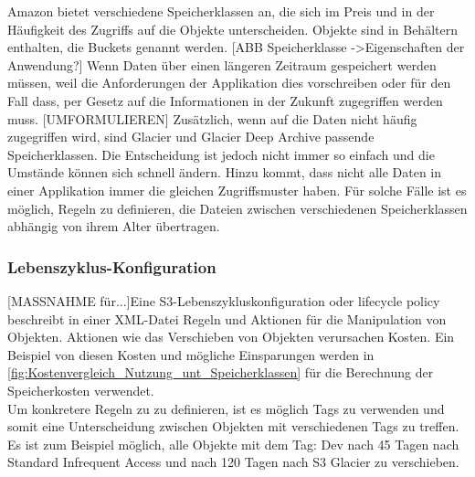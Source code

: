 Amazon bietet verschiedene Speicherklassen an, die sich im Preis und in der Häufigkeit des Zugriffs auf die Objekte unterscheiden. Objekte sind in Behältern enthalten, die Buckets genannt werden.
[ABB Speicherklasse ->Eigenschaften der Anwendung?]
Wenn Daten über einen längeren Zeitraum gespeichert werden müssen, weil die Anforderungen der Applikation dies vorschreiben oder für den Fall dass, per Gesetz auf die Informationen in der Zukunft zugegriffen werden muss.
[UMFORMULIEREN]
Zusätzlich, wenn auf die Daten nicht häufig zugegriffen wird, sind Glacier und Glacier Deep Archive passende Speicherklassen. Die Entscheidung ist jedoch nicht immer so einfach und die Umstände können sich schnell ändern. Hinzu kommt, dass nicht alle Daten in einer Applikation immer die gleichen Zugriffsmuster haben. Für solche Fälle ist es möglich, Regeln zu definieren, die Dateien zwischen verschiedenen Speicherklassen abhängig von ihrem Alter übertragen.

\subsubsection{Lebenszyklus-Konfiguration}
[MASSNAHME für...]Eine S3-Lebenszykluskonfiguration oder lifecycle policy beschreibt in einer XML-Datei Regeln und Aktionen für die Manipulation von Objekten.
Aktionen wie das Verschieben von Objekten verursachen Kosten. Ein Beispiel von diesen Kosten und mögliche Einsparungen werden in \autoref{fig:Kostenvergleich_Nutzung_unt_Speicherklassen} für die Berechnung der Speicherkosten verwendet.
\\
Um konkretere Regeln zu zu definieren, ist es möglich Tags zu verwenden und somit eine Unterscheidung zwischen Objekten mit verschiedenen Tags zu treffen.
Es ist zum Beispiel möglich, alle Objekte mit dem Tag: Dev nach 45 Tagen nach Standard Infrequent Access und nach 120 Tagen nach S3 Glacier zu verschieben.

